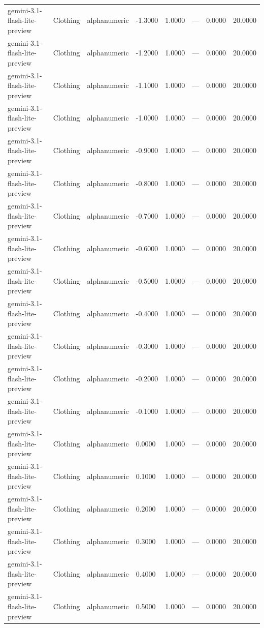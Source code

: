 \begin{table}
\begin{tabular}{llllrrrr}
gemini-3.1-flash-lite-preview & Clothing & alphanumeric & -1.3000 & 1.0000 & --- & 0.0000 & 20.0000 \\
gemini-3.1-flash-lite-preview & Clothing & alphanumeric & -1.2000 & 1.0000 & --- & 0.0000 & 20.0000 \\
gemini-3.1-flash-lite-preview & Clothing & alphanumeric & -1.1000 & 1.0000 & --- & 0.0000 & 20.0000 \\
gemini-3.1-flash-lite-preview & Clothing & alphanumeric & -1.0000 & 1.0000 & --- & 0.0000 & 20.0000 \\
gemini-3.1-flash-lite-preview & Clothing & alphanumeric & -0.9000 & 1.0000 & --- & 0.0000 & 20.0000 \\
gemini-3.1-flash-lite-preview & Clothing & alphanumeric & -0.8000 & 1.0000 & --- & 0.0000 & 20.0000 \\
gemini-3.1-flash-lite-preview & Clothing & alphanumeric & -0.7000 & 1.0000 & --- & 0.0000 & 20.0000 \\
gemini-3.1-flash-lite-preview & Clothing & alphanumeric & -0.6000 & 1.0000 & --- & 0.0000 & 20.0000 \\
gemini-3.1-flash-lite-preview & Clothing & alphanumeric & -0.5000 & 1.0000 & --- & 0.0000 & 20.0000 \\
gemini-3.1-flash-lite-preview & Clothing & alphanumeric & -0.4000 & 1.0000 & --- & 0.0000 & 20.0000 \\
gemini-3.1-flash-lite-preview & Clothing & alphanumeric & -0.3000 & 1.0000 & --- & 0.0000 & 20.0000 \\
gemini-3.1-flash-lite-preview & Clothing & alphanumeric & -0.2000 & 1.0000 & --- & 0.0000 & 20.0000 \\
gemini-3.1-flash-lite-preview & Clothing & alphanumeric & -0.1000 & 1.0000 & --- & 0.0000 & 20.0000 \\
gemini-3.1-flash-lite-preview & Clothing & alphanumeric & 0.0000 & 1.0000 & --- & 0.0000 & 20.0000 \\
gemini-3.1-flash-lite-preview & Clothing & alphanumeric & 0.1000 & 1.0000 & --- & 0.0000 & 20.0000 \\
gemini-3.1-flash-lite-preview & Clothing & alphanumeric & 0.2000 & 1.0000 & --- & 0.0000 & 20.0000 \\
gemini-3.1-flash-lite-preview & Clothing & alphanumeric & 0.3000 & 1.0000 & --- & 0.0000 & 20.0000 \\
gemini-3.1-flash-lite-preview & Clothing & alphanumeric & 0.4000 & 1.0000 & --- & 0.0000 & 20.0000 \\
gemini-3.1-flash-lite-preview & Clothing & alphanumeric & 0.5000 & 1.0000 & --- & 0.0000 & 20.0000 \\

\end{tabular}
\end{table}
